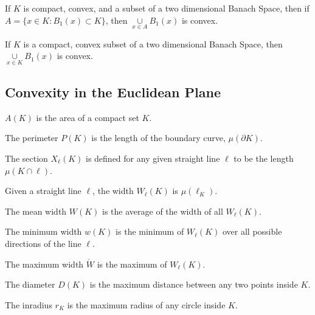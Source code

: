 \documentclass[crop=false,class=article,oneside]{standalone}
\begin{document}
        \begin{theorem}
        If $K$ is compact, convex, and a subset of a two dimensional Banach Space, then if $A = \{x\in K:B_{1}(x)\subset K\}$, then $\underset{x\in A}\cup B_{1}(x)$ is convex.
        \end{theorem}
        \begin{theorem}
        If $K$ is a compact, convex subset of a two dimensional Banach Space, then $\underset{x\in K}\cup B_{1}(x)$ is convex.
        \end{theorem}
    \subsection{Convexity in the Euclidean Plane}
        \begin{definition}
        $A(K)$ is the area of a compact set $K$.
        \end{definition}
        \begin{definition}
        The perimeter $P(K)$ is the length of the boundary curve, $\mu(\partial K)$.
        \end{definition}
        \begin{definition}
        The section $X_{\ell}(K)$ is defined for any given straight line $\ell$ to be the length $\mu(K\cap \ell)$.
        \end{definition}
        \begin{definition}
        Given a straight line $\ell$, the width $W_{\ell}(K)$ is $\mu(\ell_{K})$.
        \end{definition}
        \begin{definition}
        The mean width $W(K)$ is the average of the width of all $W_{\ell}(K)$.
        \end{definition}
        \begin{definition}
        The minimum width $w(K)$ is the minimum of $W_{\ell}(K)$ over all possible directions of the line $\ell$.
        \end{definition}
        \begin{definition}
        The maximum width $\check{W}$ is the maximum of $W_{\ell}(K)$.
        \end{definition}
        \begin{definition}
        The diameter $D(K)$ is the maximum distance between any two points inside $K$.
        \end{definition}
        \begin{definition}
        The inradius $r_K$ is the maximum radius of any circle inside $K$.
        \end{definition}
\end{document}
